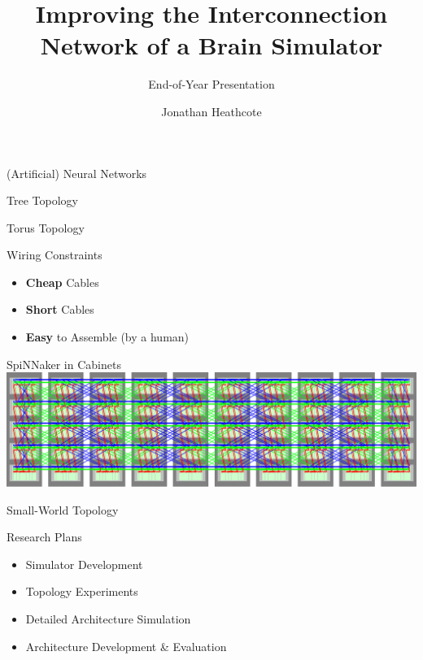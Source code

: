 \documentclass[t]{beamer}
\title{Improving the Interconnection Network of a Brain Simulator}
\subtitle{End-of-Year Presentation}
\author{Jonathan Heathcote}
\date{}
\begin{document}
	
	\maketitle
	
	\begin{frame}{(Artificial) Neural Networks}
		\center
		\only<1>{}%
		\only<2>{}%
	\end{frame}
	
	\begin{frame}{Tree Topology}
		\center
		
	\end{frame}
	
	\begin{frame}{Torus Topology}
		\center
		
	\end{frame}
	
	\begin{frame}{Wiring Constraints}
		\begin{itemize}
			\item \textbf{Cheap} Cables
			\item \textbf{Short} Cables
			\item \textbf{Easy} to Assemble (by a human)
		\end{itemize}
	\end{frame}
	
	\begin{frame}[c]{SpiNNaker in Cabinets}
		\hspace*{-0.1\textwidth}
		\includegraphics[width=1.2\textwidth]{figures/spinnaker106}
	\end{frame}
	
	\begin{frame}{Small-World Topology}
		\only<1>{\hspace{2cm}}%
		\only<2>{\hspace{2cm}}%
	\end{frame}
	
	\begin{frame}{Research Plans}
		\begin{itemize}
			\item Simulator Development
			\item Topology Experiments
			\item Detailed Architecture Simulation
			\item Architecture Development \& Evaluation
		\end{itemize}
	\end{frame}
	
\end{document}
